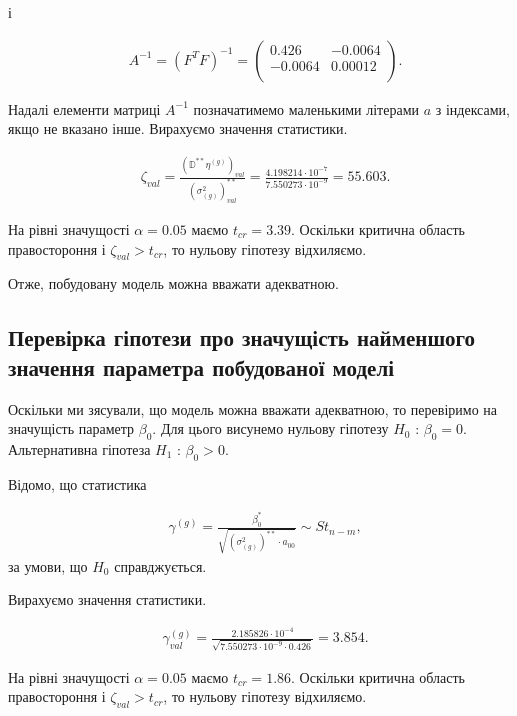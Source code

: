 \documentclass[14pt,a4paper]{scrartcl}
\theoremstyle{definition}
\theoremstyle{remark}
\theoremstyle{definition}
\theoremstyle{definition}
\begin{document}
і

\begin{align*}
  & A^{-1} = (F^{T}F)^{-1} = \begin{pmatrix}
    0.426 & -0.0064 \\
    -0.0064 & 0.00012  \\
  \end{pmatrix}.
\end{align*}

Надалі елементи матриці $A^{-1}$ позначатимемо маленькими літерами $a$ з індексами, якщо не вказано інше. Вирахуємо значення статистики.

\begin{align*}
  & \zeta_{val} = \frac{(\mathbb{D}^{**}\eta^{(g)})_{val}}{(\sigma_{(g)}^2)^{**}_{val}} = \frac{4.198214 \cdot 10^{-7}}{7.550273 \cdot 10^{-9}} = 55.603.
\end{align*}

На рівні значущості $\alpha = 0.05$ маємо $t_{cr} = 3.39$. Оскільки критична область правостороння і $\zeta_{val} > t_{cr}$, то нульову гіпотезу відхиляємо.

Отже, побудовану модель можна вважати адекватною.

\subsection{Перевірка гіпотези про значущість найменшого значення параметра побудованої моделі}

Оскільки ми з\textquotesingle ясували, що модель можна вважати адекватною, то перевіримо на значущість параметр $\beta_{0}$. Для цього висунемо нульову гіпотезу $H_{0}$ : $\beta_{0} = 0$. Альтернативна гіпотеза $H_{1}$ : $\beta_{0} > 0$.

Відомо, що статистика

\begin{align*}
  & \gamma^{(g)} = \frac{\beta_{0}^{*}}{\sqrt{(\sigma_{(g)}^2)^{**}\cdot a_{00}}} \sim St_{n - m},
\end{align*} за умови, що $H_0$ справджується.

Вирахуємо значення статистики.

\begin{align*}
  & \gamma^{(g)}_{val} = \frac{2.185826 \cdot 10^{-4}}{\sqrt{7.550273 \cdot 10^{-9} \cdot 0.426}} = 3.854.
\end{align*}

На рівні значущості $\alpha = 0.05$ маємо $t_{cr} = 1.86$. Оскільки критична область правостороння і $\zeta_{val} > t_{cr}$, то нульову гіпотезу відхиляємо.
\end{document}
